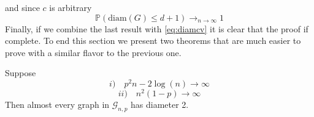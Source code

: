 	and since $c$ is arbitrary
	\begin{equation}
		\mathbb{P}(\text{diam}(G) \leq d+1) \longrightarrow_{n\to\infty} 1
	\end{equation}
	Finally, if we combine the last result with \eqref{eq:diamcv} it is clear that the proof if complete.
	\newline
	To end this section we present two theorems that are much easier to prove with a similar flavor to the previous one.
	\begin{theorem}\label{th:diam2}
	Suppose 
	\begin{equation}
		i) \quad p^2n - 2\log(n) \longrightarrow \infty
	\end{equation}
	\begin{equation}
		ii) \quad n^2(1-p) \longrightarrow \infty
	\end{equation}
	Then almost every graph in $\mathcal{G}_{n, p}$ has diameter 2.
\end{theorem}

